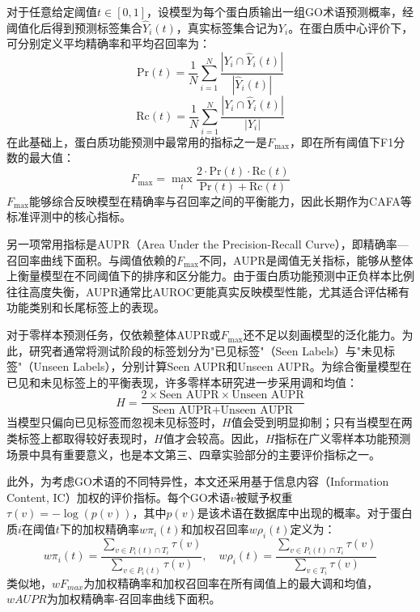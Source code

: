 对于任意给定阈值$t \in [0,1]$，设模型为每个蛋白质输出一组GO术语预测概率，经阈值化后得到预测标签集合$\hat{Y}_i(t)$，真实标签集合记为$Y_i$。在蛋白质中心评价下，可分别定义平均精确率和平均召回率为：
\begin{equation}
\text{Pr}(t)=\frac{1}{N}\sum_{i=1}^{N}\frac{|Y_i \cap \hat{Y}_i(t)|}{|\hat{Y}_i(t)|}
\end{equation}
\begin{equation}
\text{Rc}(t)=\frac{1}{N}\sum_{i=1}^{N}\frac{|Y_i \cap \hat{Y}_i(t)|}{|Y_i|}
\end{equation}
在此基础上，蛋白质功能预测中最常用的指标之一是$F_{\max}$，即在所有阈值下F1分数的最大值：
\begin{equation}
F_{\max} = \max_t \frac{2 \cdot \text{Pr}(t) \cdot \text{Rc}(t)}{\text{Pr}(t) + \text{Rc}(t)}
\end{equation}
$F_{\max}$能够综合反映模型在精确率与召回率之间的平衡能力，因此长期作为CAFA等标准评测中的核心指标。

另一项常用指标是AUPR（Area Under the Precision-Recall Curve），即精确率—召回率曲线下面积。与阈值依赖的$F_{\max}$不同，AUPR是阈值无关指标，能够从整体上衡量模型在不同阈值下的排序和区分能力。由于蛋白质功能预测中正负样本比例往往高度失衡，AUPR通常比AUROC更能真实反映模型性能，尤其适合评估稀有功能类别和长尾标签上的表现。

对于零样本预测任务，仅依赖整体AUPR或$F_{\max}$还不足以刻画模型的泛化能力。为此，研究者通常将测试阶段的标签划分为"已见标签"（Seen Labels）与"未见标签"（Unseen Labels），分别计算Seen AUPR和Unseen AUPR。为综合衡量模型在已见和未见标签上的平衡表现，许多零样本研究进一步采用调和均值：
\begin{equation}
H = \frac{2 \times \text{Seen AUPR} \times \text{Unseen AUPR}}{\text{Seen AUPR} + \text{Unseen AUPR}}
\end{equation}
当模型只偏向已见标签而忽视未见标签时，$H$值会受到明显抑制；只有当模型在两类标签上都取得较好表现时，$H$值才会较高。因此，$H$指标在广义零样本功能预测场景中具有重要意义，也是本文第三、四章实验部分的主要评价指标之一。

此外，为考虑GO术语的不同特异性，本文还采用基于信息内容（Information Content, IC）加权的评价指标。每个GO术语$v$被赋予权重$\tau(v) = -\log(p(v))$，其中$p(v)$是该术语在数据库中出现的概率。对于蛋白质$i$在阈值$t$下的加权精确率$w\pi_i(t)$和加权召回率$w\rho_i(t)$定义为：
\begin{equation}
    w\pi_i(t) = \frac{\sum_{v \in P_i(t) \cap T_i} \tau(v)}{\sum_{v \in P_i(t)} \tau(v)}, \quad w\rho_i(t) = \frac{\sum_{v \in P_i(t) \cap T_i} \tau(v)}{\sum_{v \in T_i} \tau(v)}
\end{equation}
类似地，$wF_{max}$为加权精确率和加权召回率在所有阈值上的最大调和均值，$wAUPR$为加权精确率-召回率曲线下面积。

